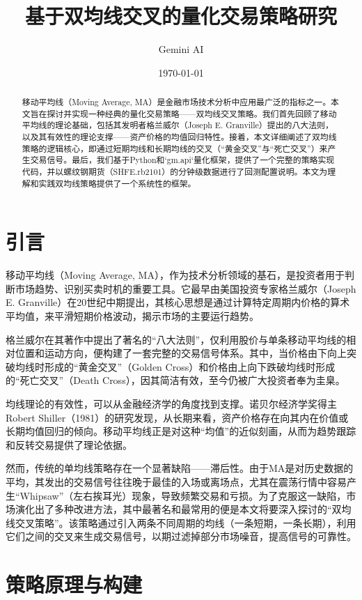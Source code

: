 \documentclass[UTF8]{ctexart}
\title{\bfseries 基于双均线交叉的量化交易策略研究}
\author{Gemini AI}
\date{\today}
\begin{document}
\maketitle

\begin{abstract}
移动平均线（Moving Average, MA）是金融市场技术分析中应用最广泛的指标之一。本文旨在探讨并实现一种经典的量化交易策略——双均线交叉策略。我们首先回顾了移动平均线的理论基础，包括其发明者格兰威尔（Joseph E. Granville）提出的八大法则，以及其有效性的理论支撑——资产价格的均值回归特性。接着，本文详细阐述了双均线策略的逻辑核心，即通过短期均线和长期均线的交叉（“黄金交叉”与“死亡交叉”）来产生交易信号。最后，我们基于Python和`gm.api`量化框架，提供了一个完整的策略实现代码，并以螺纹钢期货（SHFE.rb2101）的分钟级数据进行了回测配置说明。本文为理解和实践双均线策略提供了一个系统性的框架。
\end{abstract}

\section{引言}

移动平均线（Moving Average, MA），作为技术分析领域的基石，是投资者用于判断市场趋势、识别买卖时机的重要工具。它最早由美国投资专家格兰威尔（Joseph E. Granville）在20世纪中期提出，其核心思想是通过计算特定周期内价格的算术平均值，来平滑短期价格波动，揭示市场的主要运行趋势\cite{granville}。

格兰威尔在其著作中提出了著名的“八大法则”，仅利用股价与单条移动平均线的相对位置和运动方向，便构建了一套完整的交易信号体系。其中，当价格由下向上突破均线时形成的“黄金交叉”（Golden Cross）和价格由上向下跌破均线时形成的“死亡交叉”（Death Cross），因其简洁有效，至今仍被广大投资者奉为圭臬。

均线理论的有效性，可以从金融经济学的角度找到支撑。诺贝尔经济学奖得主Robert Shiller（1981）的研究发现，从长期来看，资产价格存在向其内在价值或长期均值回归的倾向\cite{shiller}。移动平均线正是对这种“均值”的近似刻画，从而为趋势跟踪和反转交易提供了理论依据。

然而，传统的单均线策略存在一个显著缺陷——滞后性。由于MA是对历史数据的平均，其发出的交易信号往往晚于最佳的入场或离场点，尤其在震荡行情中容易产生“Whipsaw”（左右挨耳光）现象，导致频繁交易和亏损。为了克服这一缺陷，市场演化出了多种改进方法，其中最著名和最常用的便是本文将要深入探讨的“双均线交叉策略”。该策略通过引入两条不同周期的均线（一条短期，一条长期），利用它们之间的交叉来生成交易信号，以期过滤掉部分市场噪音，提高信号的可靠性。

\section{策略原理与构建}
\end{document}
